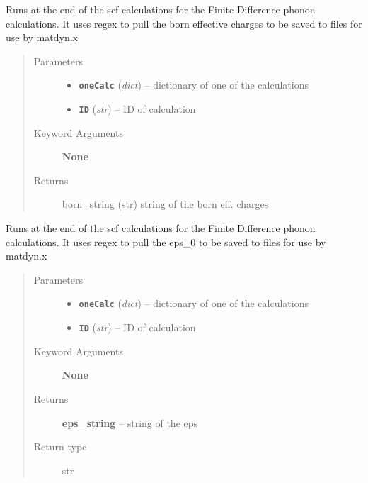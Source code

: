 \documentclass[letterpaper,10pt,english]{sphinxmanual}
\begin{document}
\begin{fulllineitems}
\label{run:run.__pull_born_out}
Runs at the end of the scf calculations for the Finite Difference phonon
calculations. It uses regex to pull the born effective charges to be saved
to files for use by matdyn.x
\begin{quote}\begin{description}
\item[{Parameters}] \leavevmode\begin{itemize}
\item {} 
\textbf{\texttt{oneCalc}} (\emph{dict}) -- dictionary of one of the calculations

\item {} 
\textbf{\texttt{ID}} (\emph{str}) -- ID of calculation

\end{itemize}

\item[{Keyword Arguments}] \leavevmode
\textbf{None}

\item[{Returns}] \leavevmode
born\_string (str) string of the born eff. charges

\end{description}\end{quote}

\end{fulllineitems}


\begin{fulllineitems}
\label{run:run.__pull_eps_out}
Runs at the end of the scf calculations for the Finite Difference phonon
calculations. It uses regex to pull the eps\_0 to be saved to files for
use by matdyn.x
\begin{quote}\begin{description}
\item[{Parameters}] \leavevmode\begin{itemize}
\item {} 
\textbf{\texttt{oneCalc}} (\emph{dict}) -- dictionary of one of the calculations

\item {} 
\textbf{\texttt{ID}} (\emph{str}) -- ID of calculation

\end{itemize}

\item[{Keyword Arguments}] \leavevmode
\textbf{None}

\item[{Returns}] \leavevmode
\textbf{eps\_string} --
string of the eps

\item[{Return type}] \leavevmode
str

\end{description}\end{quote}

\end{fulllineitems}
\end{document}
